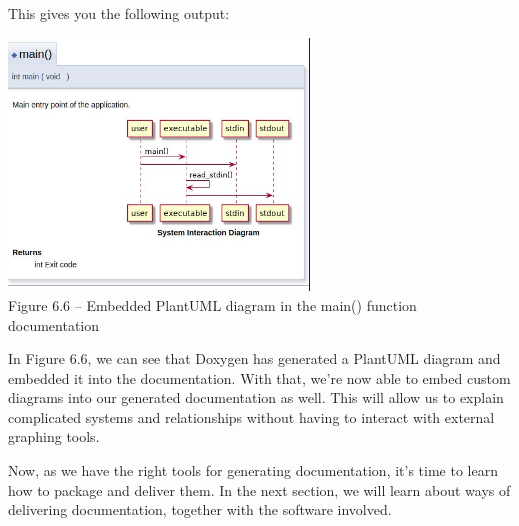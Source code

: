This gives you the following output:

\begin{center}
\includegraphics[width=0.6\textwidth]{content/2/chapter6/images/6.jpg}\\
Figure 6.6 – Embedded PlantUML diagram in the main() function documentation
\end{center}

In Figure 6.6, we can see that Doxygen has generated a PlantUML diagram and embedded it into the documentation. With that, we're now able to embed custom diagrams into our generated documentation as well. This will allow us to explain complicated systems and relationships without having to interact with external graphing tools.

Now, as we have the right tools for generating documentation, it's time to learn how to package and deliver them. In the next section, we will learn about ways of delivering documentation, together with the software involved.








